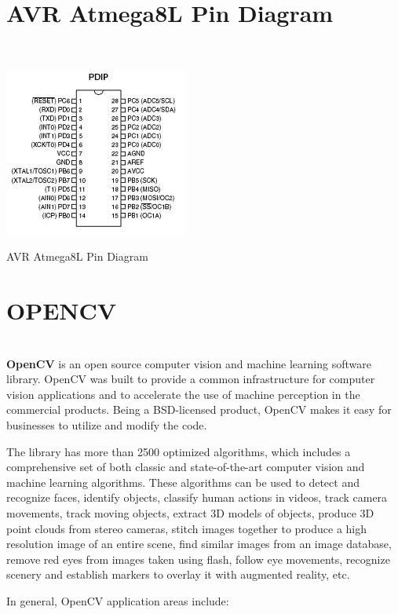 \documentclass[12pt, a4paper]{article}
\begin{document}
{\begin{appendices}
\section{AVR Atmega8L Pin Diagram}
~\\
\begin{appendixfig}
\centering
\includegraphics[scale=1.00]{avr.jpeg}
\caption{AVR Atmega8L Pin Diagram}
\label{}
\end{appendixfig}

\newpage
\section{OPENCV}
~\\
\textbf{\ac{OpenCV}} is an open source computer vision and machine learning software library. \ac{OpenCV} was built to provide a common infrastructure for computer vision applications and to accelerate the use of machine perception in the commercial products. Being a BSD-licensed product, \ac{OpenCV} makes it easy for businesses to utilize and modify the code.

The library has more than 2500 optimized algorithms, which includes a comprehensive set of both classic and state-of-the-art computer vision and machine learning algorithms. These algorithms can be used to detect and recognize faces, identify objects, classify human actions in videos, track camera movements, track moving objects, extract \ac{3D} models of objects, produce \ac{3D} point clouds from stereo cameras, stitch images together to produce a high resolution image of an entire scene, find similar images from an image database, remove red eyes from images taken using flash, follow eye movements, recognize scenery and establish markers to overlay it with augmented reality, etc.

In general, \ac{OpenCV} application areas include:


\end{appendices}}
\end{document}

